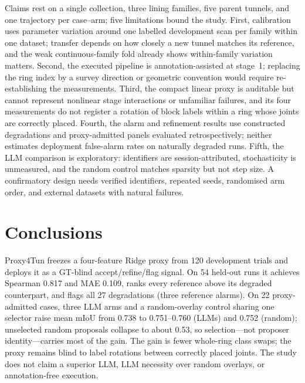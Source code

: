 \documentclass[a4paper,fleqn]{cas-dc}
\begin{document}
Claims rest on a single collection, three lining families, five parent tunnels, and one trajectory per case--arm; five limitations bound the study. First, calibration uses parameter variation around one labelled development scan per family within one dataset; transfer depends on how closely a new tunnel matches its reference, and the weak continuous-family fold already shows within-family variation matters. Second, the executed pipeline is annotation-assisted at stage~1; replacing the ring index by a survey direction or geometric convention would require re-establishing the measurements. Third, the compact linear proxy is auditable but cannot represent nonlinear stage interactions or unfamiliar failures, and its four measurements do not register a rotation of block labels within a ring whose joints are correctly placed. Fourth, the alarm and refinement results use constructed degradations and proxy-admitted panels evaluated retrospectively; neither estimates deployment false-alarm rates on naturally degraded runs. Fifth, the LLM comparison is exploratory: identifiers are session-attributed, stochasticity is unmeasured, and the random control matches sparsity but not step size. A confirmatory design needs verified identifiers, repeated seeds, randomised arm order, and external datasets with natural failures.

\section{Conclusions}\label{sec:conclusions}

Proxy4Tun freezes a four-feature Ridge proxy from 120 development trials and deploys it as a GT-blind accept/refine/flag signal. On 54 held-out runs it achieves Spearman 0.817 and MAE 0.109, ranks every reference above its degraded counterpart, and flags all 27 degradations (three reference alarms). On 22 proxy-admitted cases, three LLM arms and a random-overlay control sharing one selector raise mean mIoU from 0.738 to 0.751--0.760 (LLMs) and 0.752 (random); unselected random proposals collapse to about 0.53, so selection---not proposer identity---carries most of the gain. The gain is fewer whole-ring class swaps; the proxy remains blind to label rotations between correctly placed joints. The study does not claim a superior LLM, LLM necessity over random overlays, or annotation-free execution.

\end{document}
